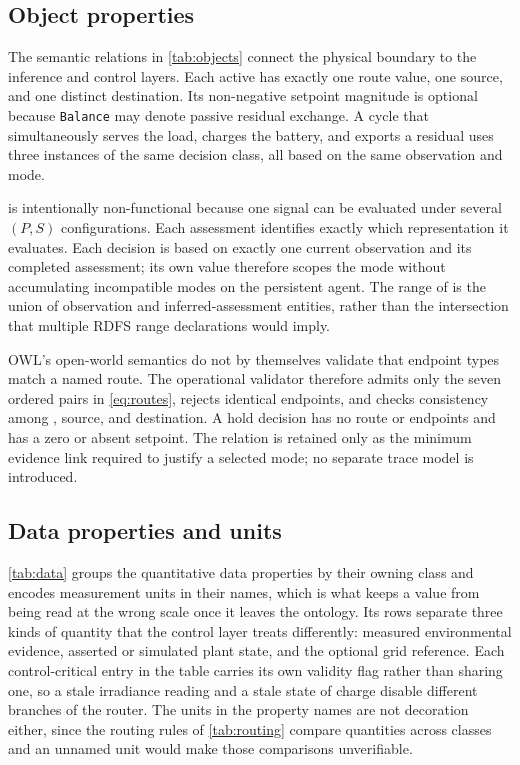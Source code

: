 \subsection{Object properties}

The semantic relations in \autoref{tab:objects} connect the physical boundary to the inference and control layers. Each active  has exactly one route value, one source, and one distinct destination. Its non-negative setpoint magnitude is optional because \texttt{Balance} may denote passive residual exchange. A cycle that simultaneously serves the load, charges the battery, and exports a residual uses three instances of the same decision class, all based on the same observation and mode.



 is intentionally non-functional because one signal can be evaluated under several $(P,S)$ configurations. Each assessment identifies exactly which representation it evaluates. Each decision is based on exactly one current observation and its completed assessment; its own  value therefore scopes the mode without accumulating incompatible modes on the persistent agent. The range of  is the union of observation and inferred-assessment entities, rather than the intersection that multiple RDFS range declarations would imply.

OWL's open-world semantics do not by themselves validate that endpoint types match a named route. The operational validator therefore admits only the seven ordered pairs in \autoref{eq:routes}, rejects identical endpoints, and checks consistency among , source, and destination. A hold decision has no route or endpoints and has a zero or absent setpoint. The  relation is retained only as the minimum evidence link required to justify a selected mode; no separate trace model is introduced.

\subsection{Data properties and units}

\autoref{tab:data} groups the quantitative data properties by their owning class and encodes measurement units in their names, which is what keeps a value from being read at the wrong scale once it leaves the ontology. Its rows separate three kinds of quantity that the control layer treats differently: measured environmental evidence, asserted or simulated plant state, and the optional grid reference. Each control-critical entry in the table carries its own validity flag rather than sharing one, so a stale irradiance reading and a stale state of charge disable different branches of the router. The units in the property names are not decoration either, since the routing rules of \autoref{tab:routing} compare quantities across classes and an unnamed unit would make those comparisons unverifiable.

